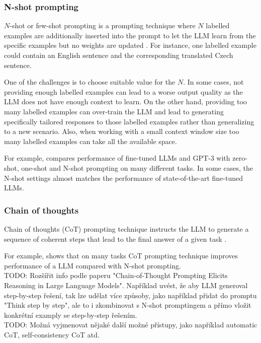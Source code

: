 \subsubsection{N-shot prompting}

$N$-shot or few-shot prompting is a prompting technique where $N$ labelled examples are additionally inserted into the prompt to let the LLM learn from the specific examples but no weights are updated \cite{Brown2020}. For instance, one labelled example could contain an English sentence and the corresponding translated Czech sentence.

One of the challenges is to choose suitable value for the $N$. In some cases, not providing enough labelled examples can lead to a worse output quality as the LLM does not have enough context to learn. On the other hand, providing too many labelled examples can over-train the LLM and lead to generating specifically tailored responses to those labelled examples rather than generalizing to a new scenario. Also, when working with a small context window size too many labelled examples can take all the available space.

For example, \citet{Brown2020} compares performance of fine-tuned LLMs and GPT-3 with zero-shot, one-shot and N-shot prompting on many different tasks. In some cases, the N-shot settings almost matches the performance of state-of-the-art fine-tuned LLMs.


\subsubsection{Chain of thoughts}

Chain of thoughts (CoT) prompting technique instructs the LLM to generate a sequence of coherent steps that lead to the final answer of a given task \cite{Wei2022}.

For example, \citet{Wei2022} shows that on many tasks CoT prompting technique improves performance of a LLM compared with N-shot prompting. \\

TODO: Rozšířit info podle paperu "Chain-of-Thought Prompting Elicits Reasoning in Large Language Models". Například uvést, že aby LLM generoval step-by-step řešení, tak lze udělat více způsoby, jako například přidat do promptu "Think step by step", ale to i zkombinovat s N-shot promptingem a přímo vložit konkrétní examply se step-by-step řešením. \\

TODO: Možná vyjmenovat nějaké další možné přístupy, jako například automatic CoT, self-consistency CoT atd. \\


